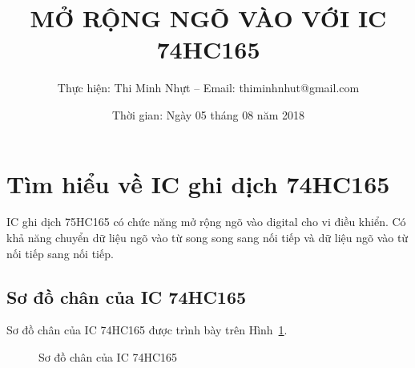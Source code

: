 \documentclass[12pt,a4paper]{article}
\title{\bfseries MỞ RỘNG NGÕ VÀO VỚI IC 74HC165}
\author{Thực hiện: Thi Minh Nhựt -- Email: thiminhnhut@gmail.com}
\date{Thời gian: Ngày 05 tháng 08 năm 2018}
\newcommand{\fig}[1]{Hình~#1}
\begin{document}
\maketitle

\tableofcontents
%
%
%

\section{Tìm hiểu về IC ghi dịch 74HC165}
    IC ghi dịch 75HC165 có chức năng mở rộng ngõ vào digital cho vi điều khiển. Có khả năng chuyển dữ liệu ngõ vào từ song song sang nối tiếp và dữ liệu ngõ vào từ nối tiếp sang nối tiếp.

\subsection{Sơ đồ chân của IC 74HC165}
    Sơ đồ chân của IC 74HC165 được trình bày trên \fig{\ref{Fig:Diagram_74HC165}}.
        \begin{figure}[htp]
            \centering
            \caption{Sơ đồ chân của IC 74HC165}
            \label{Fig:Diagram_74HC165}
        \end{figure}
\end{document}
